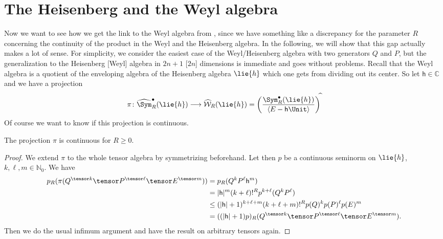 \section{The Heisenberg and the Weyl algebra}
\label{sec:chap6_HeisenbergWeyl}

Now we want to see how we get the link to the Weyl algebra from
\cite{waldmann:2014a}, since we have something like a discrepancy for the
parameter $R$ concerning the continuity of the product in the Weyl and the 
Heisenberg algebra. In the following, we will show that this gap actually makes 
a lot of sense. For simplicity, we consider the easiest case of
the Weyl/Heisenberg algebra with two generators $Q$ and $P$, but the 
generalization to the Heisenberg [Weyl] algebra in $2n + 1$ [$2n$] dimensions 
is immediate and goes without problems. 
Recall that the Weyl algebra is a quotient of the enveloping algebra of the 
Heisenberg algebra $\lie{h}$ which one gets from dividing out its center. So 
let $\mathsf{h} \in \mathbb{C}$ and we have a projection
\begin{equation}
    \label{Nilpot:WeylProjection}
    \pi \colon
    \widehat{\Sym}_R^\bullet(\lie{h})
    \longrightarrow
    \widehat{\mathcal{W}}_R(\lie{h})
    =
     \left(
    	\frac{\Sym_R^\bullet(\lie{h})}
    	{\langle E - \mathsf{h} \Unit \rangle}
    \right)^{\widehat{} }
\end{equation}
Of course we want to know if this projection is continuous.
\begin{proposition}
    \label{proposition:ProjectionWeylContinuous}%
    The projection $\pi$ is continuous for $R \geq 0$.
\end{proposition}
\begin{proof}
    We extend $\pi$ to the whole tensor algebra by symmetrizing
    beforehand. Let then $p$ be a continuous seminorm on $\lie{h}$, $k,
    \ell, m \in \mathbb{N}_0$. We have
    \begin{align*}
        p_R(\pi (
        	Q^{\tensor k} \tensor
        	P^{\tensor \ell} \tensor
        	E^{\tensor m}
        ) )
        & =
        p_R( Q^k P^{\ell} \mathsf{h}^m )
        \\
        & =
        |\mathsf{h}|^m (k + \ell)!^R
        p^{k + \ell}(Q^k P^{\ell})
        \\
        & \leq
        (|\mathsf{h}| + 1)^{k + \ell + m}
        (k + \ell + m)!^R
        p(Q)^k p(P)^{\ell} p(E)^m
        \\
        & =
        ((|\mathsf{h}| + 1) p)_R
        (Q^{\tensor k} \tensor
        P^{\tensor \ell} \tensor
        E^{\tensor m}).
    \end{align*}
    Then we do the usual infimum argument and have the result on
    arbitrary tensors again.
\end{proof}


